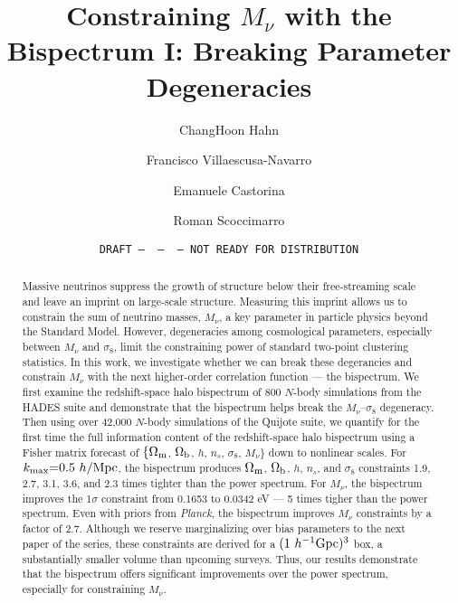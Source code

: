 \documentclass[12pt, letterpaper, preprint]{aastex62}
\newcommand{\Om}{\Omega_{\rm m}}
\newcommand{\Ob}{\Omega_{\rm b}}
\newcommand{\smnu}{M_\nu}
\newcommand{\sig}{\sigma_8}
\newcommand{\mpc}{h/{\rm Mpc}}
\newcommand{\ch}[1]{{\color{dred}{\bf CH:} #1}}
\begin{document}
\sloppy\sloppypar\frenchspacing 

\title{Constraining $\smnu$ with the Bispectrum I: Breaking Parameter Degeneracies} 
\date{\texttt{DRAFT~---~\githash~---~\gitdate~---~NOT READY FOR DISTRIBUTION}}

\author{ChangHoon Hahn}

\author{Francisco Villaescusa-Navarro} 

\author{Emanuele Castorina} 

\author{Roman Scoccimarro} 

\begin{abstract}
    Massive neutrinos suppress the growth of structure below their free-streaming scale and leave an 
    imprint on large-scale structure. Measuring this imprint allows us to constrain the sum of neutrino 
    masses, $\smnu$, a key parameter in particle physics beyond the Standard Model. However, degeneracies 
    among cosmological parameters, especially between $\smnu$ and $\sig$, limit the constraining power 
    of standard two-point clustering statistics. In this work, we investigate whether we can break these 
    degerancies and constrain $\smnu$ with the next higher-order correlation function --- the bispectrum. 
    We first examine the redshift-space halo bispectrum of $800$ $N$-body simulations from the HADES suite 
    and demonstrate that the bispectrum helps break the $\smnu$--$\sig$ degeneracy. Then using over 42,000
    $N$-body simulations of the Quijote suite, we quantify for the first time the full information content 
    of the redshift-space halo bispectrum using a Fisher matrix forecast of $\{\Om$, $\Ob$, $h$, $n_s$, $\sig$, $\smnu\}$ 
    down to nonlinear scales. For $k_{\rm max}{=}0.5~\mpc$, the bispectrum produces
    $\Om$, $\Ob$, $h$, $n_s$, and $\sig$ constraints \ch{1.9, 2.7, 3.1, 3.6, and 2.3} times tighter than the 
    power spectrum. For $\smnu$, the bispectrum improves the 1$\sigma$ constraint from 
    \ch{0.1653 to 0.0342 eV --- 5 times tigher than the power spectrum}. Even with priors from {\em Planck}, 
    the bispectrum improves $\smnu$ constraints by a factor of 2.7. Although we reserve marginalizing 
    over bias parameters to the next paper of the series, these constraints are derived for a 
    $(1~h^{-1}{\rm Gpc})^3$ box, a substantially smaller volume than upcoming surveys. Thus, our results 
    demonstrate that the bispectrum offers significant improvements over the power spectrum, especially 
    for constraining $\smnu$.  
\end{abstract}
\end{document}
